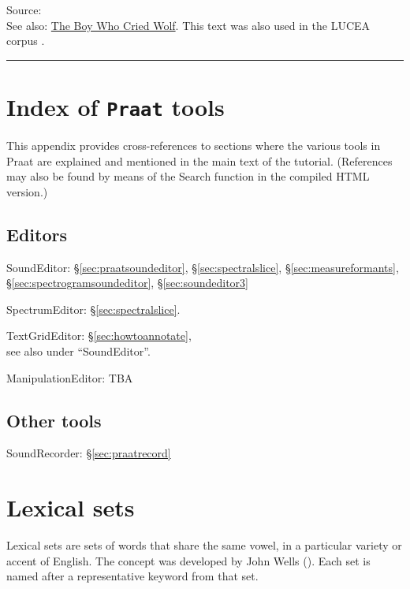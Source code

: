 \documentclass[
]{book}
\begin{document}
Source: \citet{Deterding_2006}\\
See also: \href{https://en.wikipedia.org/wiki/The_Boy_Who_Cried_Wolf}{The Boy Who Cried Wolf}. This text was also used in the LUCEA corpus \citep{Orr_Quené_2017}.

\begin{center}\rule{0.5\linewidth}{0.5pt}\end{center}

\chapter{\texorpdfstring{Index of \texttt{Praat} tools}{Index of Praat tools}}\label{app-praattools}

This appendix provides cross-references to sections where the various tools in Praat are explained and mentioned in the main text of the tutorial. (References may also be found by means of the Search function in the compiled HTML version.)

\section{Editors}\label{editors}

SoundEditor:
§\ref{sec:praatsoundeditor},
§\ref{sec:spectralslice},
§\ref{sec:measureformants},
§\ref{sec:spectrogramsoundeditor},
§\ref{sec:soundeditor3}

SpectrumEditor:
§\ref{sec:spectralslice}.

TextGridEditor:
§\ref{sec:howtoannotate},\\
see also under ``SoundEditor''.

ManipulationEditor:
TBA

\section{Other tools}\label{other-tools}

SoundRecorder:
§\ref{sec:praatrecord}

\chapter{Lexical sets}\label{app-lexicalsets}

Lexical sets are sets of words that share the same vowel, in a particular variety or accent of English.
The concept was developed by John Wells (\citet{Wells_1982}).
Each set is named after a representative keyword from that set.
\end{document}
